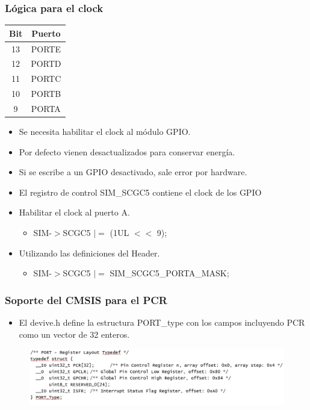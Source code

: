\documentclass[10.5pt,scale=1.0,t,aspectratio=169,hyperref={pdfpagelabels=false}]{beamer}
\begin{document}
\begin{frame}
	\frametitle{Lógica para el clock}
	\begin{center}
		\begin{tabular}{ cc } 
			\hline
			\textbf{Bit} & \textbf{Puerto}  \\ 
			\hline
			13 & PORTE  \\ 
			12 & PORTD \\ 
			11 & PORTC \\ 
			10 & PORTB \\ 
			9  & PORTA \\  
			\hline
		\end{tabular}
	\end{center}
	\begin{itemize}
		\item Se necesita habilitar el clock al módulo GPIO.
		\item Por defecto vienen desactualizados para conservar energía.
		\item Si se escribe a un GPIO desactivado, sale error por hardware. 
		\item El registro de control SIM\_SCGC5 contiene el clock de los GPIO
		\item Habilitar el clock al puerto A.
		\begin{itemize}
			\item[] SIM-$>$SCGC5 $\mid=$ (1UL $<<$  9);
		\end{itemize}
		\item Utilizando las definiciones del Header. 
		\begin{itemize}
			\item[] SIM-$>$SCGC5 $\mid=$ SIM\_SCGC5\_PORTA\_MASK;
		\end{itemize}
	\end{itemize}
	
\end{frame}
\begin{frame}
	\frametitle{Soporte del CMSIS para el PCR}
	\begin{itemize}
		\item El devive.h define la estructura PORT\_type con los campos incluyendo PCR como un vector de 32 enteros. 
	\end{itemize}
	\begin{figure}
		\centering
		\includegraphics[scale=0.4]{15_PCRStructure}
	\end{figure}
\end{frame}
\end{document}
